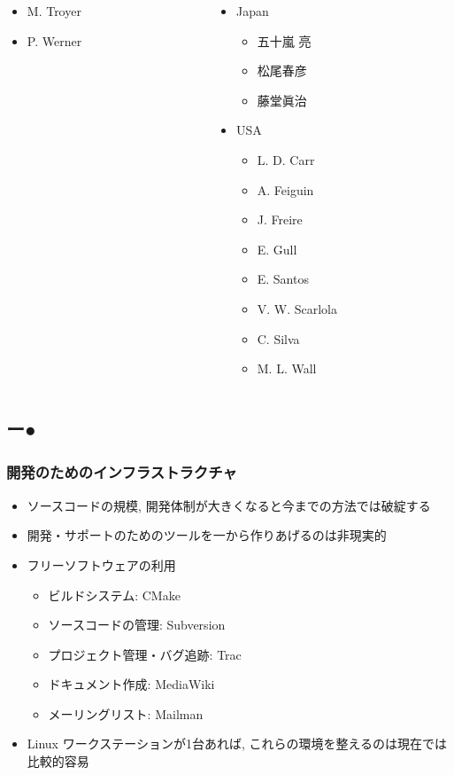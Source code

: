 \begin{frame}
\begin{columns}[T]
\begin{column}{.34\textwidth}
\begin{itemize}
\begin{itemize}
        \item M. Troyer
        \item P. Werner
        \end{itemize}
      \end{itemize}
    \end{column}
    \begin{column}{.35\textwidth}
      \begin{itemize}
      \item Japan
        \begin{itemize}
        \item 五十嵐 亮
        \item 松尾春彦
        \item 藤堂眞治
        \end{itemize}
      \item USA
        \begin{itemize}
        \item L. D. Carr
        \item A. Feiguin
        \item J. Freire
        \item E. Gull
        \item E. Santos
        \item V. W. Scarlola
        \item C. Silva
        \item M. L. Wall
        \end{itemize}
      \end{itemize}
    \end{column}
  \end{columns}
\end{frame}

\subsection*{{\protect\color{red}ー}{\protect\color{blue}●}}

\begin{frame}
  \frametitle{開発のためのインフラストラクチャ}
  \begin{itemize}
  \item ソースコードの規模, 開発体制が大きくなると今までの方法では破綻する
  \item 開発・サポートのためのツールを一から作りあげるのは非現実的
  \item フリーソフトウェアの利用
    \begin{itemize}
    \item ビルドシステム: CMake
    \item ソースコードの管理: Subversion
    \item プロジェクト管理・バグ追跡: Trac
    \item ドキュメント作成: MediaWiki
    \item メーリングリスト: Mailman
    \end{itemize}
  \item Linux ワークステーションが1台あれば, これらの環境を整えるのは現在では比較的容易
  \end{itemize}
\end{frame}

